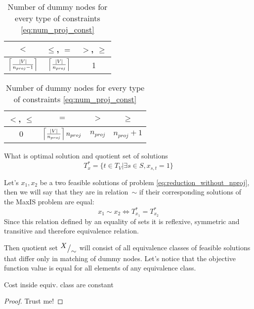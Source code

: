 \begin{table}[h]
    \begin{subtable}[t]{0.5\linewidth}
        \centering
        \renewcommand{\arraystretch}{1.5}
        \begin{tabular}{|c|c|c|}
            \hline
            \(<\)                                 & \( \leq \), \( = \)               & \(>\), \( \geq \) \\
            \hline
            \( \left\lceil \frac{|V|}{n_{proj} - 1} \right\rceil \) & \( \left\lceil \frac{|V|}{n_{proj}} \right\rceil \) & 1                 \\
            \hline
        \end{tabular}
        \caption{For source nodes}
        \label{tab:src_dummy_nodes_num}
    \end{subtable}
    \begin{subtable}[t]{0.5\linewidth}
        \centering
        \renewcommand{\arraystretch}{1.5}
        \begin{tabular}{|c|c|c|c|}
            \hline
            \(<\), \(\leq\) & \( = \)                                    & \(>\)          & \( \geq \)         \\
            \hline
            \( 0 \)         & \( \left\lceil \frac{|V|}{n_{proj}} \right\rceil n_{proj} \) & \( n_{proj} \) & \( n_{proj} + 1 \) \\
            \hline
        \end{tabular}
        \caption{For target nodes}
        \label{tab:tgt_dummy_nodes_num}
    \end{subtable}
    \caption{Number of dummy nodes for every type of constraints \eqref{eq:num_proj_const}}
    \label{tab:dummy_nodes_num}
\end{table}

What is optimal solution and quotient set of solutions
\[
    T^*_{x} = \{ t \in T_V | \exists s \in S, x_{s, t} = 1 \}
\]

Let's \( x_1, x_2 \) be a two feasible solutions of problem \eqref{eq:reduction_without_nproj}, then we will say that
they are in relation~\( \sim \) if their corresponding solutions of the MaxIS problem are equal:
\[
    x_1 \sim x_2 \Leftrightarrow T^{*}_{x_1} = T^{*}_{x_2}
\]
Since this relation defined by an equality of sets it is reflexive, symmetric and transitive and therefore
equivalence relation.

Then quotient set \( {^{\textstyle X}\big/_{\textstyle \sim}} \) will consist of all equivalence classes of feasible solutions
that differ only in matching of dummy nodes. Let's notice that the objective function value is equal for all
elements of any equivalence class.
\begin{lemma}
    Cost inside equiv. class are constant
\end{lemma}
\begin{proof}
    Trust me!
\end{proof}

